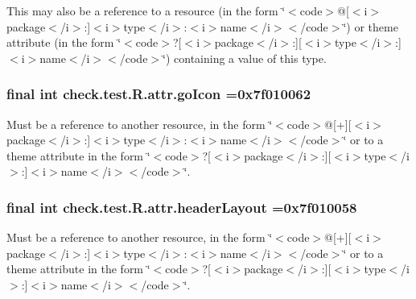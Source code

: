 This may also be a reference to a resource (in the form \char`\"{}$<$code$>$@\mbox{[}$<$i$>$package$<$/i$>$\+:\mbox{]}$<$i$>$type$<$/i$>$\+:$<$i$>$name$<$/i$>$$<$/code$>$\char`\"{}) or theme attribute (in the form \char`\"{}$<$code$>$?\mbox{[}$<$i$>$package$<$/i$>$\+:\mbox{]}\mbox{[}$<$i$>$type$<$/i$>$\+:\mbox{]}$<$i$>$name$<$/i$>$$<$/code$>$\char`\"{}) containing a value of this type. \hypertarget{classcheck_1_1test_1_1_r_1_1attr_aeed41eb5bc4a4ba79928aa878a07a01c}{}
\subsubsection[{go\+Icon}]{\setlength{\rightskip}{0pt plus 5cm}final int check.\+test.\+R.\+attr.\+go\+Icon =0x7f010062\hspace{0.3cm}{\ttfamily [static]}}\label{classcheck_1_1test_1_1_r_1_1attr_aeed41eb5bc4a4ba79928aa878a07a01c}
Must be a reference to another resource, in the form \char`\"{}$<$code$>$@\mbox{[}+\mbox{]}\mbox{[}$<$i$>$package$<$/i$>$\+:\mbox{]}$<$i$>$type$<$/i$>$\+:$<$i$>$name$<$/i$>$$<$/code$>$\char`\"{} or to a theme attribute in the form \char`\"{}$<$code$>$?\mbox{[}$<$i$>$package$<$/i$>$\+:\mbox{]}\mbox{[}$<$i$>$type$<$/i$>$\+:\mbox{]}$<$i$>$name$<$/i$>$$<$/code$>$\char`\"{}. \hypertarget{classcheck_1_1test_1_1_r_1_1attr_aa746f0c87830e1191999d068e48d164b}{}
\subsubsection[{header\+Layout}]{\setlength{\rightskip}{0pt plus 5cm}final int check.\+test.\+R.\+attr.\+header\+Layout =0x7f010058\hspace{0.3cm}{\ttfamily [static]}}\label{classcheck_1_1test_1_1_r_1_1attr_aa746f0c87830e1191999d068e48d164b}
Must be a reference to another resource, in the form \char`\"{}$<$code$>$@\mbox{[}+\mbox{]}\mbox{[}$<$i$>$package$<$/i$>$\+:\mbox{]}$<$i$>$type$<$/i$>$\+:$<$i$>$name$<$/i$>$$<$/code$>$\char`\"{} or to a theme attribute in the form \char`\"{}$<$code$>$?\mbox{[}$<$i$>$package$<$/i$>$\+:\mbox{]}\mbox{[}$<$i$>$type$<$/i$>$\+:\mbox{]}$<$i$>$name$<$/i$>$$<$/code$>$\char`\"{}. \hypertarget{classcheck_1_1test_1_1_r_1_1attr_ad0373977141facd56b9a985852b9a5c4}{}
